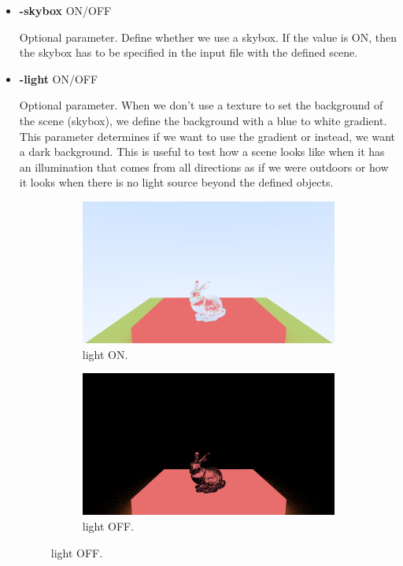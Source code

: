\documentclass[titlepage,12pt]{report}
\begin{document}
\begin{itemize}
\item \textbf{-skybox} ON/OFF

Optional parameter. Define whether we use a skybox. If the value is ON, then the skybox has to be specified in the input file with the defined scene.

\item \textbf{-light} ON/OFF

Optional parameter. When we don't use a texture to set the background of the scene (skybox), we define the background with a blue to white gradient. This parameter determines if we want to use the gradient or instead, we want a dark background. This is useful to test how a scene looks like when it has an illumination that comes from all directions as if we were outdoors or how it looks when there is no light source beyond the defined objects.

\begin{figure}[H]
	\centering
	\medskip
	\begin{subfigure}{.48\textwidth}
		\centering
		\includegraphics[scale=0.315]{media/bunny.png}
		\caption{light ON.}
		\label{light1}
	\end{subfigure}
	\begin{subfigure}{.48\textwidth}
		\centering
		\includegraphics[scale=0.315]{media/bunny_noktem.png}
		\caption{light OFF.}
		\label{light2}
	\end{subfigure}
\end{figure}


\end{itemize}
\end{document}
